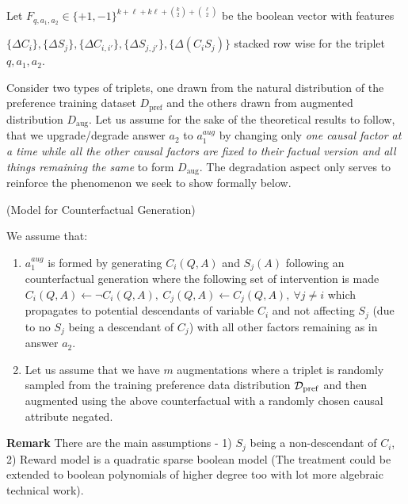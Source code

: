 Let $F_{q,a_1,a_2} \in \{+1,-1\}^{k + \ell + k \ell + \binom{k}{2} + \binom{\ell}{2}}$ be the boolean vector with features 

$ \{\Delta C_i\} , \{\Delta S_j\}, \{\Delta C_{i,i'} \}, \{\Delta S_{j,j'}\}, \{\Delta (C_iS_j)\}$ stacked row wise for the triplet $q,a_1,a_2$.

Consider two types of triplets, one drawn from the natural distribution of the preference training dataset $D_{\mathrm{pref}}$ and the others drawn from augmented distribution $D_{\mathrm{aug}}$. Let us assume for the sake of the theoretical results to follow, that we upgrade/degrade answer $a_2$ to $a^{aug}_1$ by changing only \textit{one causal factor at a time while all the other causal factors are fixed to their factual version and all things remaining the same} to form $D_{\mathrm{aug}}$. The degradation aspect only serves to reinforce the phenomenon we seek to show formally below.


\begin{assumption}(Model for Counterfactual Generation)\label{assum:gen}

We assume that: 
\begin{enumerate}
\item $a^{aug}_1$ is formed by generating $C_i(Q,A)$ and $S_j(A)$ following an counterfactual generation where the following set of intervention is made  $C_i(Q,A) \leftarrow   \neg C_i(Q,A), ~ C_{j}(Q,A) \leftarrow C_j(Q,A),~ \forall j \neq i$ which propagates to potential descendants of variable $C_i$ and not affecting $S_j$ (due to no $S_j$ being a descendant of $C_j$) with all other factors remaining as in answer $a_2$. 
\item Let us assume that we have $m$ augmentations where a triplet is randomly sampled from the training preference data distribution ${\cal D}_{\mathrm{pref}}$ and then augmented using the above counterfactual with a randomly chosen causal attribute negated.
\end{enumerate}
\end{assumption}

\textbf{Remark} There are the main assumptions - 1) $S_j$ being a non-descendant of $C_i$, 2) Reward model is a quadratic sparse boolean model (The treatment could be extended to boolean polynomials of higher degree too with lot more algebraic technical work).

